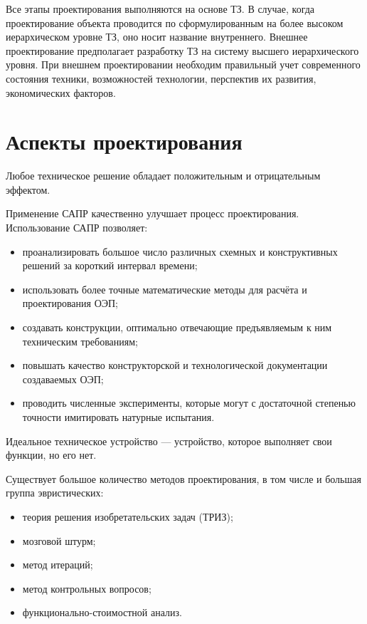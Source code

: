 Все этапы проектирования выполняются на основе ТЗ. В случае, когда проектирование объекта проводится по сформулированным на более высоком иерархическом уровне ТЗ, оно носит название внутреннего. Внешнее проектирование предполагает разработку ТЗ на систему высшего иерархического уровня. При внешнем проектировании необходим правильный учет современного состояния техники, возможностей технологии, перспектив их развития, экономических факторов.

\section{Аспекты проектирования}
Любое техническое решение обладает положительным и отрицательным эффектом. 

Применение САПР качественно улучшает процесс проектирования. 
Использование САПР позволяет:
\begin{itemize}
	\item проанализировать большое число различных схемных и конструктивных решений за короткий интервал времени;
	\item использовать более точные математические методы для расчёта и проектирования ОЭП;
	\item создавать конструкции, оптимально отвечающие предъявляемым к ним техническим требованиям;
	\item повышать качество конструкторской и технологической документации создаваемых ОЭП;
	\item проводить численные эксперименты, которые могут с достаточной степенью точности имитировать натурные испытания.
\end{itemize}

Идеальное техническое устройство --- устройство, которое выполняет свои функции, но его нет.

Существует большое количество методов проектирования, в том числе и большая группа эвристических:
\begin{itemize}
	\item теория решения изобретательских задач (ТРИЗ);
	\item мозговой штурм;
	\item метод итераций;
	\item метод контрольных вопросов;
	\item функционально-стоимостной анализ.
\end{itemize}


